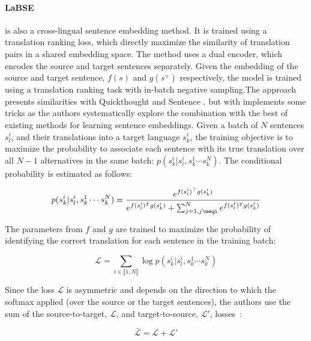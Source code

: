 \paragraph{LaBSE} \parencite{feng_22} is also a cross-lingual sentence embedding method. It is trained using a translation ranking loss, which directly maximize the similarity of translation pairs in a shared embedding space. The method uses a dual encoder, which encodes the source and target sentences separately. Given the embedding of the source and target sentence, $f(s)$ and $g(s^+)$ respectively, the model is trained using a translation ranking task with in-batch negative sampling.The approach presents similarities with Quickthought \parencite{logeswaran_18} and Sentence \bert \parencite{reimers_19}. but with implements some tricks as the authors systematically explore the combination with the best of existing methods for learning sentence embeddings. Given a batch of $N$ sentences $s^i_l$, and their translations into a target language $s^i_k$, the training objective is to maximize the probability to associate each sentence with its true translation over all $N-1$ alternatives in the same batch: $p(s^i_k | s^i_l, s^1_k \cdots s^N_k)$. The conditional probability is estimated as follows:

\begin{equation*}
    p(s^i_k | s^i_l, s^1_k \cdots s^N_k) = \frac{e^{f(s^i_l)^{\top}g(s^i_k)}}{e^{f(s^i_l)^Tg(s^i_k)}+\sum_{j=1, j\neqi}^Ne^{f(s^j_l)^Tg(s^j_k)}}    
\end{equation*}

The parameters from $f$ and $g$ are trained to maximize the probability of identifying the correct translation for each sentence in the training batch:

\begin{equation*}
    \mathcal{L} = \sum_{i \in \llbracket1,N\rrbracket} \log p(s^i_k | s^i_l, s^1_k \cdots s^N_k)
\end{equation*}

Since the loss $\mathcal{L}$ is asymmetric and depends on the direction to which the softmax applied (over the source or the target sentences), the authors use the sum of the source-to-target, $\mathcal{L}$, and target-to-source, $\mathcal{L}'$, losses~\parencite{yang_19}:

\begin{equation}
    \bar{\mathcal{L}} = \mathcal{L} + \mathcal{L}'
\label{eq:softmax_ams_combined}
\end{equation}

